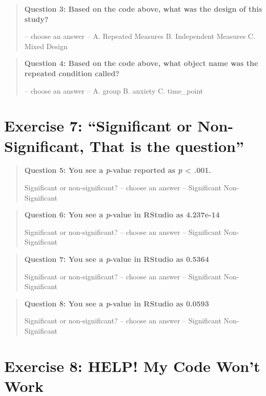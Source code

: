 \documentclass[
]{book}
\let\oldsection\section
\renewcommand{\section}{\needspace{5\baselineskip}\oldsection}
\begin{document}
\begin{quote}
\textbf{Question 3: Based on the code above, what was the design of this study?}

-- choose an answer -- A. Repeated Measures B. Independent Measures C. Mixed Design
\end{quote}

\begin{quote}
\textbf{Question 4: Based on the code above, what object name was the repeated condition called?}

-- choose an answer -- A. group B. anxiety C. time\_point
\end{quote}

\section{Exercise 7: ``Significant or Non-Significant, That is the question''}\label{exercise-7-significant-or-non-significant-that-is-the-question}

\begin{quote}
\textbf{Question 5: You see a \emph{p}-value reported as \emph{p} \textless{} .001.}

Significant or non-significant? -- choose an answer -- Significant Non-Significant
\end{quote}

\begin{quote}
\textbf{Question 6: You see a \emph{p}-value in RStudio as 4.237e-14}

Significant or non-significant? -- choose an answer -- Significant Non-Significant
\end{quote}

\begin{quote}
\textbf{Question 7: You see a \emph{p}-value in RStudio as 0.5364}

Significant or non-significant? -- choose an answer -- Significant Non-Significant
\end{quote}

\begin{quote}
\textbf{Question 8: You see a \emph{p}-value in RStudio as 0.0593}

Significant or non-significant? -- choose an answer -- Significant Non-Significant
\end{quote}

\section{Exercise 8: HELP! My Code Won't Work}\label{exercise-8-help-my-code-wont-work}
\end{document}

